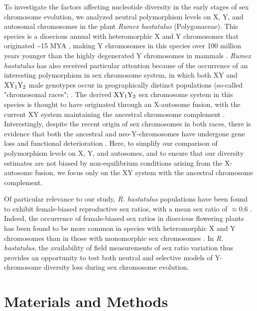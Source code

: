 \documentclass[9pt,twocolumn,twoside]{gsajnl}
\begin{document}
To investigate the factors affecting nucleotide diversity in the early stages of sex chromosome evolution, we analyzed neutral polymorphism levels on X, Y, and autosomal chromosomes in the plant \textit{Rumex hastatulus }(Polygonaceae). This species is a dioecious annual with heteromorphic X and Y chromosomes that originated \textasciitilde 15 MYA \citep{quesada2011,grabowska2015,navajas2005}, making Y chromosomes in this species over 100 million years younger than the highly degenerated Y chromosomes in mammals \citep{lahn1999,ross2005dna}. \textit{Rumex hastatulus} has also received particular attention because of the occurrence of an interesting polymorphism in sex chromosome system, in which both XY and $\textnormal{XY}_\textnormal{1}\textnormal{Y}_\textnormal{2}$ male genotypes occur in geographically distinct populations (so-called "chromosomal races"; \citealt{smith1963mechanism}. The derived $\textnormal{XY}_\textnormal{1}\textnormal{Y}_\textnormal{2}$ sex chromosome system in this species is thought to have originated through an X-autosome fusion, with the current XY system maintaining the ancestral chromosome complement \citep{smith1964evolving}. Interestingly, despite the recent origin of sex chromosomes in both races, there is evidence that both the ancestral and neo-Y-chromosomes have undergone gene loss and functional deterioration \citep{hough2014}. Here, to simplify our comparison of polymorphism levels on X, Y, and autosomes, and to ensure that our diversity estimates are not biased by non-equilibrium conditions arising from the X-autosome fusion, we focus only on the XY system with the ancestral chromosome complement.

Of particular relevance to our study, \textit{R. hastatulus} populations have been found to exhibit female-biased reproductive sex ratios, with a mean sex ratio of $\approx 0.6$ \citep{pickup2013influence}. Indeed, the occurrence of female-biased sex ratios in dioecious flowering plants has been found to be more common in species with heteromorphic X and Y chromosomes than in those with monomorphic sex chromosomes \citep{field2013comparative,hough2013evolutionarily}. In \textit{R. hastatulus}, the availability of field measurements of sex ratio variation thus provides an opportunity to test both neutral and selective models of Y-chromosome diversity loss during sex chromosome evolution.

\section*{Materials and Methods}
\end{document}
